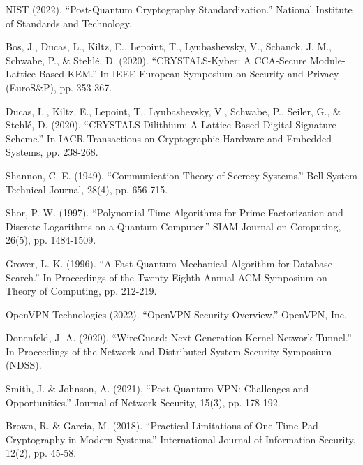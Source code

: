 \documentclass[12pt,a4paper]{report}
\begin{document}
\begin{thebibliography}{99}
 NIST (2022). ``Post-Quantum Cryptography Standardization.'' National Institute of Standards and Technology.

 Bos, J., Ducas, L., Kiltz, E., Lepoint, T., Lyubashevsky, V., Schanck, J. M., Schwabe, P., \& Stehlé, D. (2020). ``CRYSTALS-Kyber: A CCA-Secure Module-Lattice-Based KEM.'' In IEEE European Symposium on Security and Privacy (EuroS\&P), pp. 353-367.

 Ducas, L., Kiltz, E., Lepoint, T., Lyubashevsky, V., Schwabe, P., Seiler, G., \& Stehlé, D. (2020). ``CRYSTALS-Dilithium: A Lattice-Based Digital Signature Scheme.'' In IACR Transactions on Cryptographic Hardware and Embedded Systems, pp. 238-268.

 Shannon, C. E. (1949). ``Communication Theory of Secrecy Systems.'' Bell System Technical Journal, 28(4), pp. 656-715.

 Shor, P. W. (1997). ``Polynomial-Time Algorithms for Prime Factorization and Discrete Logarithms on a Quantum Computer.'' SIAM Journal on Computing, 26(5), pp. 1484-1509.

 Grover, L. K. (1996). ``A Fast Quantum Mechanical Algorithm for Database Search.'' In Proceedings of the Twenty-Eighth Annual ACM Symposium on Theory of Computing, pp. 212-219.

 OpenVPN Technologies (2022). ``OpenVPN Security Overview.'' OpenVPN, Inc.

 Donenfeld, J. A. (2020). ``WireGuard: Next Generation Kernel Network Tunnel.'' In Proceedings of the Network and Distributed System Security Symposium (NDSS).

 Smith, J. \& Johnson, A. (2021). ``Post-Quantum VPN: Challenges and Opportunities.'' Journal of Network Security, 15(3), pp. 178-192.

 Brown, R. \& Garcia, M. (2018). ``Practical Limitations of One-Time Pad Cryptography in Modern Systems.'' International Journal of Information Security, 12(2), pp. 45-58.
\end{thebibliography}
\end{document}
